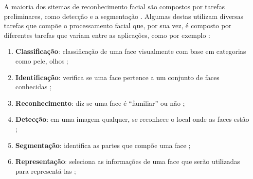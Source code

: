 A maioria dos sitemas de reconhecimento facial são compostos por tarefas preliminares, como detecção e a segmentação \cite{Sun98}. 
Algumas destas utilizam diversas tarefas que compõe o processamento facial que, por sua vez, é composto por diferentes tarefas que variam entre as aplicações, como por exemplo \cite{saocarlos}:
	\begin{enumerate}
		\item \textbf{Classificação}: classificação de uma face visualmente com base em categorias como pele, olhos \cite{Abd95};
		\item \textbf{Identificação}: verifica se uma face pertence a um conjunto de faces conhecidas \cite{Cell99};
		\item \textbf{Reconhecimento}: diz se uma face é ``familiar'' ou não \cite{Abd95};
		\item \textbf{Detecção}: em uma imagem qualquer, se reconhece o local onde as faces estão \cite{Cell99};
		\item \textbf{Segmentação}: identifica as partes que compõe uma face \cite{Cell99};
		\item \textbf{Representação}: seleciona as informações de uma face que serão utilizadas para representá-las \cite{Cell99};
	\end{enumerate}






